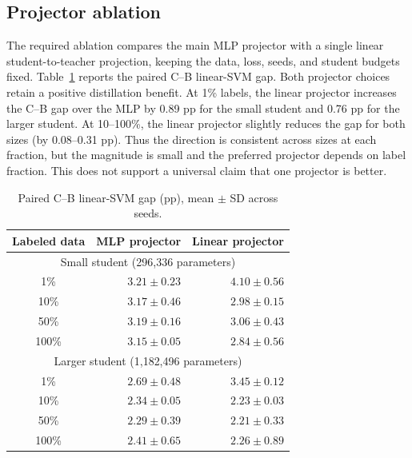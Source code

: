 \documentclass[10pt]{article}
\begin{document}
\subsection{Projector ablation}

The required ablation compares the main MLP projector with a single linear
student-to-teacher projection, keeping the data, loss, seeds, and student
budgets fixed. Table~\ref{tab:ablation} reports the paired C--B linear-SVM
gap. Both projector choices retain a positive distillation benefit. At 1\%
labels, the linear projector increases the C--B gap over the MLP by 0.89
pp for the small student and 0.76 pp for the larger student. At 10--100\%,
the linear projector slightly reduces the gap for both sizes (by 0.08--0.31
pp). Thus the direction is consistent across sizes at each fraction, but
the magnitude is small and the preferred projector depends on label
fraction. This does not support a universal claim that one projector is
better.

\begin{table}[H]
\centering
\caption{Paired C--B linear-SVM gap (pp), mean $\pm$ SD across seeds.}
\label{tab:ablation}
\small
\begin{tabular}{crr}
\toprule
Labeled data & MLP projector & Linear projector \\
\midrule
\multicolumn{3}{c}{Small student (296,336 parameters)}\\
\midrule
1\%   & $3.21\pm0.23$ & $4.10\pm0.56$ \\
10\%  & $3.17\pm0.46$ & $2.98\pm0.15$ \\
50\%  & $3.19\pm0.16$ & $3.06\pm0.43$ \\
100\% & $3.15\pm0.05$ & $2.84\pm0.56$ \\
\midrule
\multicolumn{3}{c}{Larger student (1,182,496 parameters)}\\
\midrule
1\%   & $2.69\pm0.48$ & $3.45\pm0.12$ \\
10\%  & $2.34\pm0.05$ & $2.23\pm0.03$ \\
50\%  & $2.29\pm0.39$ & $2.21\pm0.33$ \\
100\% & $2.41\pm0.65$ & $2.26\pm0.89$ \\
\bottomrule
\end{tabular}
\end{table}
\end{document}
